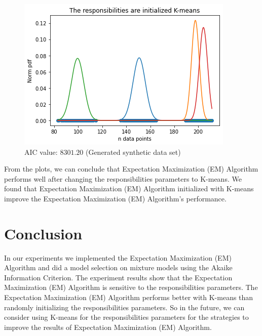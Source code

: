 \documentclass[abstract=true]{scrartcl}
\begin{document}
\begin{figure}[H]
{\begin{minipage}[c]{0.5\textwidth}
 		\includegraphics[width=\textwidth]{images/kmeans_sample.png}
 		\vspace{-20px}
 		\caption{AIC value: $8301.20$ (Generated synthetic data
set)}
	\end{minipage}}
\end{figure}
From the plots, we can conclude that Expectation Maximization (EM) Algorithm performs well after changing the responsibilities parameters to K-means. We found that Expectation Maximization (EM) Algorithm initialized with K-means improve the Expectation Maximization (EM) Algorithm's performance. 
\vspace{10px}
\section{Conclusion}
In our experiments we implemented the Expectation Maximization (EM) Algorithm and did a model selection on mixture models using the Akaike Information Criterion. The experiment results show that the Expectation Maximization (EM) Algorithm is sensitive to the responsibilities parameters. The Expectation Maximization (EM) Algorithm performs better with K-means than randomly initializing the responsibilities parameters. So in the future, we can consider using K-means for the responsibilities parameters for the strategies to improve the results of Expectation Maximization (EM) Algorithm.
\vspace{20px}
\printbibliography
\end{document}
